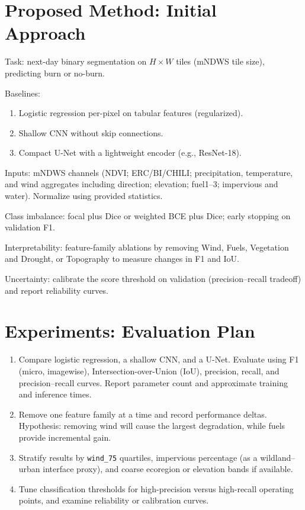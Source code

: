 \documentclass[conference]{IEEEtran}
\begin{document}
\section{Proposed Method: Initial Approach}
Task: next-day binary segmentation on $H\times W$ tiles (mNDWS tile size), predicting burn or no-burn.

Baselines:
\begin{enumerate}
    \item Logistic regression per-pixel on tabular features (regularized).
    \item Shallow CNN without skip connections.
    \item Compact U-Net with a lightweight encoder (e.g., ResNet-18).
\end{enumerate}

Inputs: mNDWS channels (NDVI; ERC/BI/CHILI; precipitation, temperature, and wind aggregates including direction; elevation; fuel1--3; impervious and water). Normalize using provided statistics.

Class imbalance: focal plus Dice or weighted BCE plus Dice; early stopping on validation F1.

Interpretability: feature-family ablations by removing Wind, Fuels, Vegetation and Drought, or Topography to measure changes in F1 and IoU.

Uncertainty: calibrate the score threshold on validation (precision–recall tradeoff) and report reliability curves.

\section{Experiments: Evaluation Plan}

\begin{enumerate}
    \item {} Compare logistic regression, a shallow CNN, and a U-Net. Evaluate using F1 (micro, imagewise), Intersection-over-Union (IoU), precision, recall, and precision–recall curves. Report parameter count and approximate training and inference times.

    \item {} Remove one feature family at a time and record performance deltas. Hypothesis: removing wind will cause the largest degradation, while fuels provide incremental gain.

    \item {} Stratify results by \texttt{wind\_75} quartiles, impervious percentage (as a wildland–urban interface proxy), and coarse ecoregion or elevation bands if available.

    \item {} Tune classification thresholds for high-precision versus high-recall operating points, and examine reliability or calibration curves.
\end{enumerate}
\end{document}
